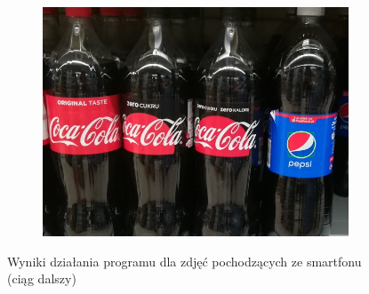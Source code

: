 \documentclass[11pt,a4paper,twoside]{report}
\begin{document}
\begin{figure}
\begin{subfigure}[b]{0.48\textwidth}
	        \includegraphics[width=\textwidth]{img/camera/8}
	    \end{subfigure}
	    \caption{Wyniki działania programu dla zdjęć pochodzących ze smartfonu (ciąg dalszy)}
	    \label{fig:smartfon-1}
	\end{figure}
\end{document}
